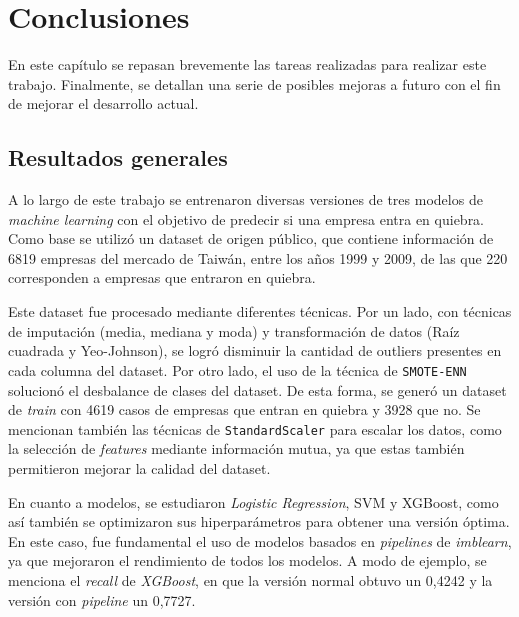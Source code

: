 \chapter{Conclusiones} %

\label{Chapter5}

En este capítulo se repasan brevemente las tareas realizadas para realizar este trabajo. Finalmente, se detallan una serie de posibles mejoras a futuro con el fin de mejorar el desarrollo actual.


\section{Resultados generales}

A lo largo de este trabajo se entrenaron diversas versiones de tres modelos de \textit{machine learning} con el objetivo de predecir si una empresa entra en quiebra. Como base se utilizó un dataset de origen público, que contiene información de 6819 empresas del mercado de Taiwán, entre los años 1999 y 2009, de las que 220 corresponden a empresas que entraron en quiebra.

Este dataset fue procesado mediante diferentes técnicas. Por un lado, con técnicas de imputación (media, mediana y moda) y transformación de datos (Raíz cuadrada y Yeo-Johnson), se logró disminuir la cantidad de outliers presentes en cada columna del dataset. Por otro lado, el uso de la técnica de \texttt{SMOTE-ENN} solucionó el desbalance de clases del dataset. De esta forma, se generó un dataset de \textit{train} con 4619 casos de empresas que entran en quiebra y 3928 que no. Se mencionan también las técnicas de \texttt{StandardScaler} para escalar los datos, como la selección de \textit{features} mediante información mutua, ya que estas también permitieron mejorar la calidad del dataset.

En cuanto a modelos, se estudiaron \textit{Logistic Regression}, SVM y XGBoost, como así también se optimizaron sus hiperparámetros para obtener una versión óptima. En este caso, fue fundamental el uso de modelos basados en \textit{pipelines} de \textit{imblearn}, ya que mejoraron el rendimiento de todos los modelos. A modo de ejemplo, se menciona el \textit{recall} de \textit{XGBoost}, en que la versión normal obtuvo un 0,4242 y la versión con \textit{pipeline} un 0,7727.

